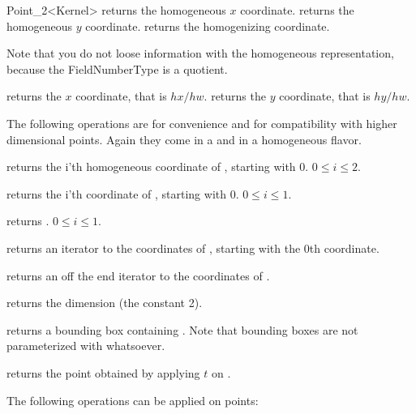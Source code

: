 \begin{ccRefClass} {Point_2<Kernel>}
       {returns the homogeneous $x$ coordinate.}
\ccGlue
{}
       {returns the homogeneous $y$ coordinate.}
\ccGlue
{}
       {returns the homogenizing  coordinate.}
       
Note that you do not loose information with the homogeneous
representation, because the FieldNumberType is a quotient.

       {returns the  $x$ coordinate, that is $hx/hw$.}
\ccGlue
{}
       {returns the  $y$ coordinate, that is $hy/hw$.}
       
The following operations are for convenience and for compatibility
with higher dimensional points. Again they come in a
 and in a homogeneous flavor.

       {returns the i'th homogeneous coordinate of \ccVar, starting with 0.
        \ccPrecond $0\leq i \leq 2$.}

       {returns the i'th  coordinate of \ccVar, starting with 0.
        \ccPrecond $0\leq i \leq 1$.}


       {returns .
        \ccPrecond $0\leq i \leq 1$.}

       {returns an iterator to the  coordinates 
        of \ccVar, starting with the 0th coordinate.}

       {returns an off the end iterator to the  
        coordinates of \ccVar.}

       {returns the dimension (the constant 2).}

       {returns a bounding box containing \ccVar. Note that bounding boxes
        are not parameterized with whatsoever. }

       {returns the point obtained by applying $t$ on \ccVar.}



The following operations can be applied on points:


\end{ccRefClass}
